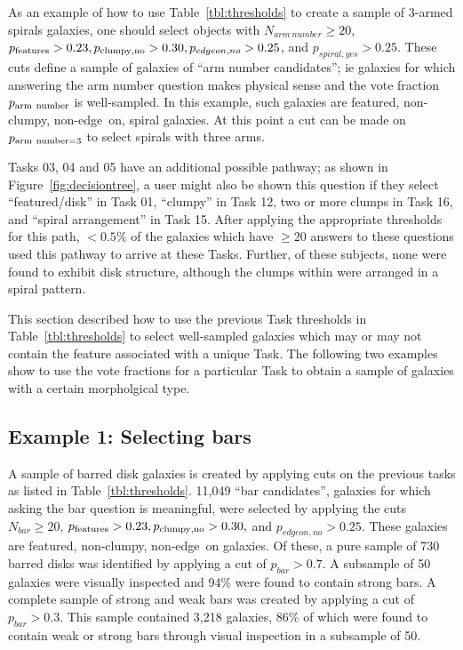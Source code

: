 \documentclass[twocolumn]{aastex6}
\begin{document}
As an example of how to use Table~\ref{tbl:thresholds} to create a sample of 3-armed spirals galaxies, one should select objects with $N_{arm~number} \ge 20$, $p_{\rm features}>0.23, p_{\rm clumpy,no} > 0.30, p_{edgeon,no}>0.25$, and $p_{spiral,yes}>0.25$. These cuts define a sample of galaxies of ``arm number candidates''; ie galaxies for which answering the arm number question makes physical sense and the vote fraction $p_{\rm arm~number}$ is well-sampled. In this example, such galaxies are featured, non-clumpy, non-edge~on, spiral galaxies. At this point a cut can be made on $p_{\rm arm~number=3}$ to select spirals with three arms. 

Tasks 03, 04 and 05 have an additional possible pathway; as shown in Figure~\ref{fig:decisiontree}, a user might also be shown this question if they select ``featured/disk'' in Task 01, ``clumpy'' in Task 12, two or more clumps in Task 16, and ``spiral arrangement'' in Task 15. After applying the appropriate thresholds for this path, $< 0.5\%$ of the galaxies which have $\ge 20$ answers to these questions used this pathway to arrive at these Tasks. Further, of these subjects, none were found to exhibit disk structure, although the clumps within were arranged in a spiral pattern. 

This section described how to use the previous Task thresholds in Table~\ref{tbl:thresholds} to select well-sampled galaxies which may or may not contain the feature associated with a unique Task. The following two examples show to use the vote fractions for a particular Task to obtain a sample of galaxies with a certain morpholgical type.

\subsection{Example 1: Selecting bars} 

A sample of barred disk galaxies is created by applying cuts on the previous tasks as listed in Table~\ref{tbl:thresholds}. 11,049 ``bar candidates'', galaxies for which asking the bar question is meaningful, were selected by applying the cuts $N_{bar} \ge 20$, $p_{\rm features}>0.23, p_{\rm clumpy,no} > 0.30,$ and $p_{edgeon,no}>0.25$. These galaxies are featured, non-clumpy, non-edge~on galaxies. Of these, a pure sample of 730 barred disks was identified by applying a cut of $p_{bar}>0.7$. A subsample of 50 galaxies were visually inspected and 94\% were found to contain strong bars. A complete sample of strong and weak bars was created by applying a cut of $p_{bar}>0.3$. This sample contained 3,218 galaxies, 86\% of which were found to contain weak or strong bars through visual inspection in a subsample of 50.
\end{document}
